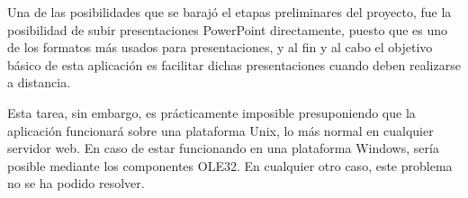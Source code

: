 Una de las posibilidades que se barajó el etapas preliminares del proyecto, fue la posibilidad de subir presentaciones PowerPoint directamente, puesto que es uno de los formatos más usados para presentaciones, y al fin y al cabo el objetivo básico de esta aplicación es facilitar dichas presentaciones cuando deben realizarse a distancia.

Esta tarea, sin embargo, es prácticamente imposible presuponiendo que la aplicación funcionará sobre una plataforma Unix, lo más normal en cualquier servidor web. En caso de estar funcionando en una plataforma Windows, sería posible mediante los componentes OLE32. En cualquier otro caso, este problema no se ha podido resolver.



